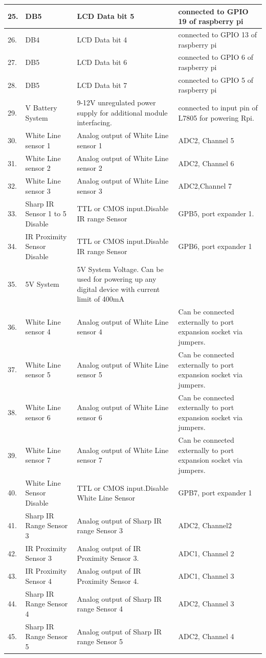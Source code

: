 \documentclass[a4paper,12pt,oneside]{book}
\begin{document}
\begin{tabular}{|p{2cm}|p{3cm}|p{6cm}|p{5cm}|}
	\hline
25. & DB5 & LCD Data bit 5& connected to GPIO 19 of raspberry pi\\
\hline
26. & DB4 & LCD Data bit 4& connected to GPIO 13 of raspberry pi\\
\hline
27. & DB5 & LCD Data bit 6&connected to GPIO 6 of raspberry pi\\
\hline
28. & DB5 & LCD Data bit 7& connected to GPIO 5 of raspberry pi\\
\hline
29. & V Battery System & 9-12V unregulated power supply for additional module interfacing. & connected to input pin of L7805 for powering Rpi. \\
\hline
30. & White Line sensor 1 & Analog output of White Line sensor 1 &ADC2, Channel 5\\
\hline
31. & White Line sensor 2 & Analog output of White Line sensor 2 &ADC2, Channel 6\\
\hline

32. & White Line sensor 3 & Analog output of White Line sensor 3& ADC2,Channel 7 \\
\hline
33. & Sharp IR Sensor 1 to 5 Disable &TTL or CMOS input.Disable IR range Sensor & GPB5, port expander 1.\\
\hline
34. &IR Proximity Sensor Disable &TTL or CMOS input.Disable IR range Sensor &  GPB6, port expander 1\\
	\hline
35. &5V System &5V System Voltage. Can be used for powering up any digital device with current limit of 400mA&  \\ 
\hline
36. & White Line sensor 4 & Analog output of White Line sensor 4 &Can be connected externally to port expansion socket via jumpers.\\
\hline
37. & White Line sensor 5 & Analog output of White Line sensor 5&Can be connected externally to port expansion socket via jumpers.\\
\hline
38. & White Line sensor 6 & Analog output of White Line sensor 6&Can be connected externally to port expansion socket via jumpers.\\
\hline
39. & White Line sensor 7 & Analog output of White Line sensor 7&Can be connected externally to port expansion socket via jumpers.\\
	\hline
40. & White Line Sensor Disable &TTL or CMOS input.Disable White Line Sensor& GPB7, port expander 1\\
\hline
41. &Sharp IR Range Sensor 3 &Analog output of Sharp IR range Sensor 3&ADC2, Channel2  \\ 
\hline
42. &IR Proximity Sensor 3 &Analog output of IR Proximity Sensor 3.&ADC1, Channel 2 \\ 
\hline
43. &IR Proximity Sensor 4 &Analog output of IR Proximity Sensor 4.& ADC1, Channel 3 \\
\hline 
44. &Sharp IR Range Sensor 4 &Analog output of Sharp IR range Sensor 4& ADC2, Channel 3 \\
\hline 
45. &Sharp IR Range Sensor 5 &Analog output of Sharp IR range Sensor 5& ADC2, Channel 4  \\ 
\hline
\end{tabular}
\end{document}
